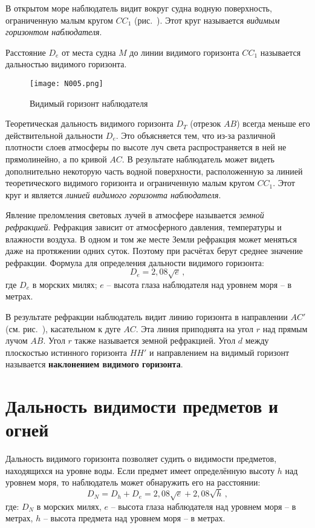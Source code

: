 В открытом море наблюдатель видит вокруг судна водную поверхность,
ограниченную малым кругом $CC_1$ (рис.~). Этот круг называется
\textit{видимым горизонтом наблюдателя}.

Расстояние $D_e$ от места судна $M$ до линии видимого горизонта $CC_1$
называется дальностью видимого горизонта.

\begin{figure}[htb]
  \centering{}
  \texttt{[image: N005.png]}
  \caption{Видимый горизонт наблюдателя}
  \label{fig:N5}
\end{figure}

Теоретическая дальность видимого горизонта $D_T$ (отрезок $AB$) всегда
меньше его действительной дальности $D_e$. Это объясняется тем, что
из-за различной плотности слоев атмосферы по высоте луч света
распространяется в ней не прямолинейно, а по кривой $AC$. В результате
наблюдатель может видеть дополнительно некоторую часть водной
поверхности, расположенную за линией теоретического видимого горизонта
и ограниченную малым кругом $CC_1$. Этот круг и является \textit{линией
видимого горизонта наблюдателя}.

Явление преломления световых лучей в атмосфере называется
\textit{земной рефракцией}. Рефракция зависит
от атмосферного давления, температуры и влажности воздуха. В одном и
том же месте Земли рефракция может меняться даже на протяжении одних
суток. Поэтому при расчётах берут среднее значение рефракции. Формула
для определения дальности видимого горизонта:
%
\begin{equation}
  D_e = 2,08 \sqrt{e} \, ,
\end{equation}
%
где $D_e$ в морских милях; $e$ \--- высота глаза наблюдателя над
уровнем моря \--- в метрах.

В результате рефракции наблюдатель видит линию горизонта в направлении
$AC'$ (см. рис.~), касательном к дуге $AC$. Эта линия
приподнята на угол $r$ над прямым лучом $AB$. Угол $r$ также
называется земной рефракцией. Угол $d$ между плоскостью истинного
горизонта $HH'$ и направлением на видимый горизонт называется
\textbf{наклонением видимого горизонта}.

\section{Дальность видимости предметов и огней}

Дальность видимого горизонта позволяет судить о видимости предметов,
находящихся на уровне воды. Если предмет имеет определённую высоту $h$
над уровнем моря, то наблюдатель может обнаружить его на расстоянии:
%
\begin{equation}
  D_N = D_h + D_e = 2,08 \sqrt{e} + 2,08 \sqrt{h} \, , 
\end{equation}
%
где: $D_N$ в морских милях, $e$ \--- высота глаза наблюдателя над
уровнем моря \--- в метрах, $h$ \--- высота предмета над уровнем моря
\--- в метрах.

